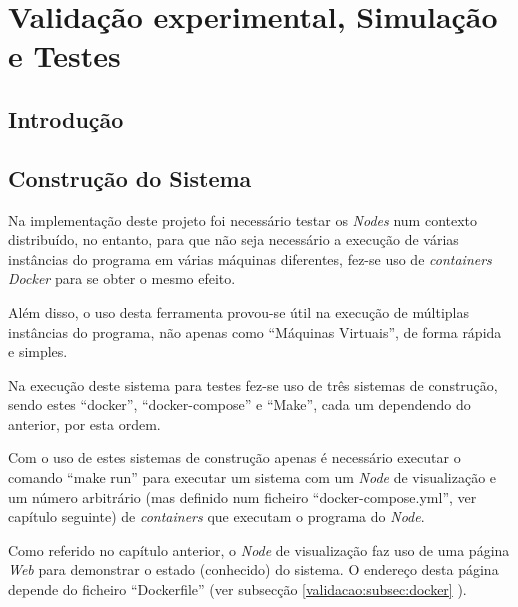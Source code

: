 \chapter{Validação experimental, Simulação e Testes}
\label{chap:validacao}

\section{Introdução}
\label{validacao:sec:introducao}

\section{Construção do Sistema}
\label{validacao:sec:construcao}

Na implementação deste projeto foi necessário testar os \emph{Nodes} num contexto distribuído, no entanto, para que não seja necessário a execução de várias instâncias do programa em várias máquinas diferentes, fez-se uso de \emph{containers Docker} para se obter o mesmo efeito.

Além disso, o uso desta ferramenta provou-se útil na execução de múltiplas instâncias do programa, não apenas como ``Máquinas Virtuais'', de forma rápida e simples.

Na execução deste sistema para testes fez-se uso de três sistemas de construção, sendo estes ``docker'', ``docker-compose'' e ``Make'', cada um dependendo do anterior, por esta ordem.

Com o uso de estes sistemas de construção apenas é necessário executar o comando ``make run'' para executar um sistema com um \emph{Node} de visualização e um número arbitrário (mas definido num ficheiro ``docker-compose.yml'', ver capítulo seguinte) de \emph{containers} que executam o programa do \emph{Node}.

Como referido no capítulo anterior, o \emph{Node} de visualização faz uso de uma página \emph{Web} para demonstrar o estado (conhecido) do sistema. O endereço desta página depende do ficheiro ``Dockerfile'' (ver subsecção 
\ref{validacao:subsec:docker}
).


